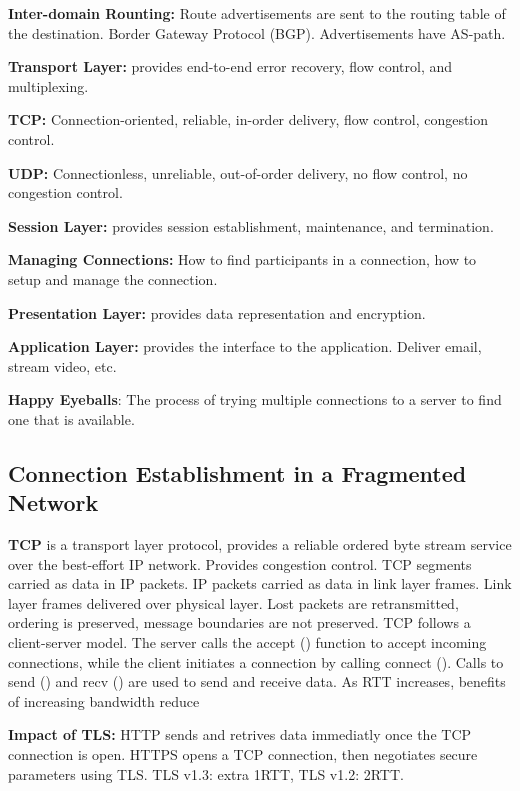 \documentclass{article}
\begin{document}
\noindent \textbf{Inter-domain Rounting:} Route advertisements are sent to the routing table of the destination. Border Gateway Protocol (BGP). Advertisements have AS-path.


\noindent \textbf{Transport Layer:} provides end-to-end error recovery, flow control, and multiplexing.

\noindent \textbf{TCP:} Connection-oriented, reliable, in-order delivery, flow control, congestion control.

\noindent \textbf{UDP:} Connectionless, unreliable, out-of-order delivery, no flow control, no congestion control.


\noindent \textbf{Session Layer:} provides session establishment, maintenance, and termination.

\noindent \textbf{Managing Connections:} How to find participants in a connection, how to setup and manage the connection.

\noindent \textbf{Presentation Layer:} provides data representation and encryption.

\noindent \textbf{Application Layer:} provides the interface to the application. Deliver email, stream video, etc.

\noindent \textbf{Happy Eyeballs}: The process of trying multiple connections to a server to find one that is available.


\subsection*{Connection Establishment in a Fragmented Network}

\noindent \textbf{TCP} is a transport layer protocol, provides a reliable ordered byte stream service over the 
best-effort IP network. Provides congestion control. 
TCP segments carried as data in IP packets. 
IP packets carried as data in link layer frames. Link layer frames delivered over physical layer.
Lost packets are retransmitted, ordering is preserved, message boundaries are not preserved.
TCP follows a client-server model. 
The server calls the accept () function to accept incoming connections, while the client initiates a connection by calling connect ().
Calls to send () and recv () are used to send and receive data.
As RTT increases, benefits of increasing bandwidth reduce

\noindent \textbf{Impact of TLS:}
HTTP sends and retrives data immediatly once the TCP connection is open.
HTTPS opens a TCP connection, then negotiates secure parameters using TLS.\@
TLS v1.3: extra 1RTT, TLS v1.2: 2RTT.\@
\end{document}
